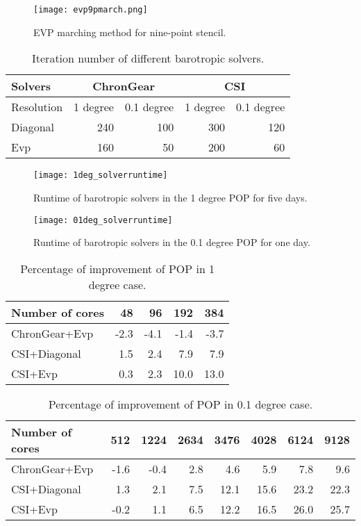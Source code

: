 \documentclass{sig-alternate}
\begin{document}
\begin {figure}
\centering
\texttt{[image: evp9pmarch.png]}
\caption []{EVP marching method for nine-point stencil.\label {fig:evp9p}}
\end {figure}


\begin{table}
\centering
\caption{Iteration number of different barotropic solvers. \label{tab:iteration_evp}}
\begin{tabular}{|l|r|r|r|r|}
\hline
Solvers & \multicolumn{2}{|c|}{ChronGear} & \multicolumn{2}{|c|}{CSI}\\ \hline
Resolution &  1 degree  & 0.1 degree	& 1 degree  & 0.1 degree\\\hline
Diagonal    &  240  & 100	&300 & 120\\\hline
Evp         & 160   & 50	&200 & 60\\\hline
\end{tabular}
\end{table}


\begin {figure}
\centering
\texttt{[image: 1deg\_solverruntime]}
\caption []{Runtime of barotropic solvers in the 1 degree POP for five days.\label {fig:runtime1}}
\end {figure}

\begin {figure}
\centering
\texttt{[image: 01deg\_solverruntime]}
\caption []{Runtime of barotropic solvers in the 0.1 degree POP for one day.\label {fig:runtime01}}
\end {figure}

\begin{table*}
\centering
\caption{Percentage of improvement of POP in 1 degree case.  \label{tab:improve_1}}
\begin{tabular}{|l|r|r|r|r|}
\hline
Number of cores & 48  & 96   & 192 & 384 \\\hline
ChronGear+Evp &-2.3 &-4.1	&-1.4  & -3.7 \\\hline
CSI+Diagonal  & 1.5 & 2.4	&7.9  &7.9 \\\hline
CSI+Evp	      &0.3 & 2.3	&10.0  &13.0 \\\hline
\end{tabular}
\end{table*}


\begin{table*}
\centering
\caption {Percentage of improvement of POP in 0.1 degree case.  \label{tab:improve_01}}
\begin{tabular}{|l|r|r|r|r|r|r|r|}
\hline
Number of cores & 512  & 1224   & 2634 & 3476 & 4028 & 6124 & 9128\\
\hline
ChronGear+Evp &-1.6 &-0.4	&2.8  & 4.6 & 5.9 & 7.8 & 9.6\\\hline
CSI+Diagonal  & 1.3 & 2.1	&7.5  &12.1 &15.6 &23.2 &22.3\\\hline
CSI+Evp	      &-0.2 & 1.1	&6.5  &12.2 &16.5 &26.0 &25.7\\
\hline
\end{tabular}
\end{table*}
\end{document}
